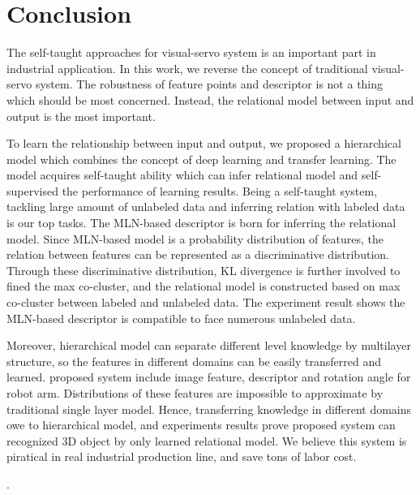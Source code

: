 \documentclass[journal]{IEEEtran}
\begin{document}
\section{Conclusion}
The self-taught approaches for visual-servo system is an important part in industrial application. In this work, we reverse the concept of traditional visual-servo system. The robustness of feature points and descriptor is not a thing which should be most concerned. Instead, the relational model between input and output is the most important. 

To learn the relationship between input and output, we proposed a hierarchical model which combines the concept of deep learning and transfer learning. The model acquires self-taught ability which can infer relational model and self-supervised the performance of learning results. Being a self-taught system, tackling large amount of unlabeled data and inferring relation with labeled data is our top tasks. The MLN-based descriptor is born for inferring the relational model. Since MLN-based model is a probability distribution of features, the relation between features can be represented as a discriminative distribution. Through these discriminative distribution, KL divergence is further involved to fined the max co-cluster, and the relational model is constructed based on max co-cluster between labeled and unlabeled data. The experiment result shows the MLN-based descriptor is compatible to face numerous unlabeled data.

Moreover, hierarchical model can separate different level knowledge by multilayer structure, so the features in different domains can be easily transferred and learned. proposed system include image feature, descriptor and rotation angle for robot arm. Distributions of these features are impossible to approximate by traditional single layer model. Hence, transferring knowledge in different domains owe to hierarchical model, and experiments results prove proposed system can recognized 3D object by only learned relational model. We believe this system is piratical in real industrial production line, and save tons of labor cost.





.
\ifCLASSOPTIONcaptionsoff
  \newpage
\fi
\end{document}
